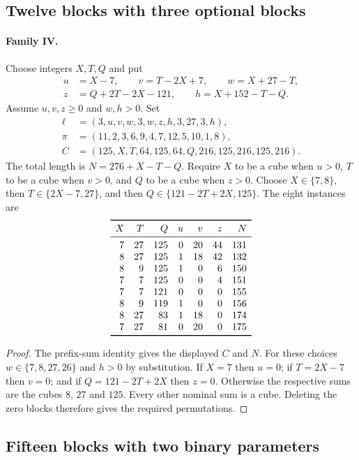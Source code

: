 \subsection{Twelve blocks with three optional blocks}
\paragraph{Family IV.}
Choose integers $X,T,Q$ and put
\[
\begin{split}
u&=X-7,\qquad v=T-2X+7,\qquad w=X+27-T,\\
z&=Q+2T-2X-121,\qquad h=X+152-T-Q.
\end{split}
\]
Assume $u,v,z\ge0$ and $w,h>0$. Set
\[
\begin{split}
\ell&=(3,u,v,w,3,w,z,h,3,27,3,h),\\
\pi&=(11,2,3,6,9,4,7,12,5,10,1,8),\\
C&=(125,X,T,64,125,64,Q,216,125,216,125,216).
\end{split}
\]
The total length is $N=276+X-T-Q$. Require $X$ to be a cube when
$u>0$, $T$ to be a cube when $v>0$, and $Q$ to be a cube when $z>0$.
Choose $X\in\{7,8\}$, then $T\in\{2X-7,27\}$, and then
$Q\in\{121-2T+2X,125\}$. The eight instances are
\[
\begin{array}{rrrrrrr}\toprule
X&T&Q&u&v&z&N\\\midrule
7&27&125&0&20&44&131\\
8&27&125&1&18&42&132\\
8&9&125&1&0&6&150\\
7&7&125&0&0&4&151\\
7&7&121&0&0&0&155\\
8&9&119&1&0&0&156\\
8&27&83&1&18&0&174\\
7&27&81&0&20&0&175\\\bottomrule
\end{array}
\]
\begin{proof}
The prefix-sum identity gives the displayed $C$ and $N$.
For these choices $w\in\{7,8,27,26\}$ and $h>0$ by substitution.
If $X=7$ then $u=0$; if $T=2X-7$ then $v=0$; and if
$Q=121-2T+2X$ then $z=0$. Otherwise the respective sums are the
cubes $8$, $27$ and $125$. Every other nominal sum is a cube.
Deleting the zero blocks therefore gives the required permutations.
\end{proof}

\subsection{Fifteen blocks with two binary parameters}
